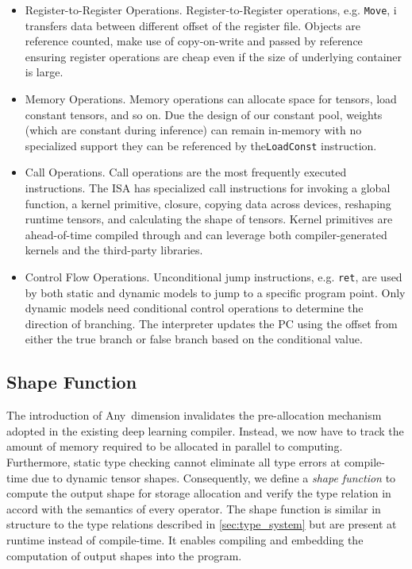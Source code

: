 \begin{itemize}
    \item Register-to-Register Operations. Register-to-Register operations, e.g. \texttt{Move}, i
          transfers data between different offset of the register file.
          Objects are reference counted, make use of copy-on-write and passed by reference ensuring register
          operations are cheap even if the size of underlying container is large.
    \item Memory Operations. Memory operations can allocate space for tensors, load constant tensors, and so on.
          Due the design of our constant pool, weights (which are constant during inference) can remain in-memory
          with no specialized support they can be referenced by the\texttt{LoadConst} instruction.
    \item Call Operations. Call operations are the most frequently executed instructions.
          The ISA has specialized call instructions for invoking a global function, a kernel
          primitive, closure, copying data across devices, reshaping runtime tensors,
          and calculating the shape of tensors.
          Kernel primitives are ahead-of-time compiled through and can leverage both compiler-generated
          kernels and the third-party libraries.
    \item Control Flow Operations.
          Unconditional jump instructions, e.g. \texttt{ret}, are used by both static and dynamic models
          to jump to a specific program point.
          Only dynamic models need conditional control operations to determine the direction of branching.
          The interpreter updates the PC using the offset from either the true branch or false branch based
          on the conditional value.
\end{itemize}

\subsection{Shape Function}
\label{sec:compilation:shape-func}

The introduction of Any~dimension invalidates the pre-allocation mechanism
  adopted in the existing deep learning compiler.
Instead, we now have to track the amount of memory
  required to be allocated in parallel to computing.
Furthermore, static type checking cannot eliminate all
  type errors at compile-time due to dynamic tensor shapes.
Consequently, we define a {\em shape function} to compute
  the output shape for storage allocation and
  verify the type relation in accord with the semantics of every operator.
The shape function is similar in structure to the type relations
  described in \autoref{sec:type_system} but are present at runtime instead of compile-time.
It enables compiling and embedding the computation of output shapes into the program.

